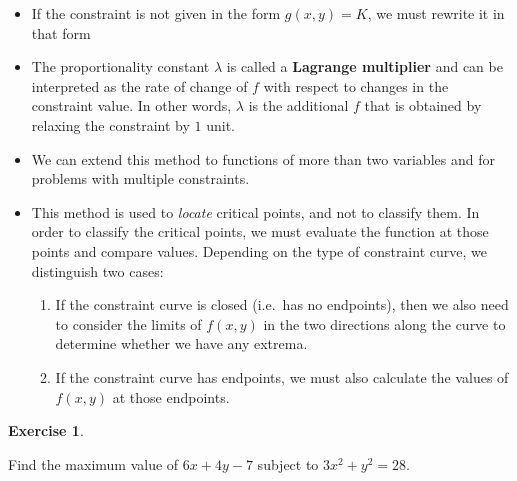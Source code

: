 \documentclass[
]{book}
\providecommand{\tightlist}{%
  \setlength{\itemsep}{0pt}\setlength{\parskip}{0pt}}
\theoremstyle{definition}
\theoremstyle{definition}
\theoremstyle{definition}
\newtheorem{exercise}{Exercise}[chapter]
\theoremstyle{definition}
\theoremstyle{remark}
\begin{document}
\begin{itemize}
\tightlist
\item
  If the constraint is not given in the form \(g(x,y)=K\), we must rewrite it in that form
\item
  The proportionality constant \(\lambda\) is called a \textbf{Lagrange multiplier} and can be interpreted as the rate of change of \(f\) with respect to changes in the constraint value. In other words, \(\lambda\) is the additional \(f\) that is obtained by relaxing the constraint
  by \(1\) unit.
\item
  We can extend this method to functions of more than two variables and for problems with multiple constraints.
\item
  This method is used to \emph{locate} critical points, and not to classify them. In order to classify the critical points, we must evaluate the function at those points and compare values. Depending on the type of constraint curve, we distinguish two cases:

  \begin{enumerate}
  \def\labelenumi{\arabic{enumi}.}
  \tightlist
  \item
    If the constraint curve is closed (i.e.~has no endpoints), then we also need to consider the limits of \(f(x,y)\) in the two directions along the curve to determine whether we have any extrema.
  \item
    If the constraint curve has endpoints, we must also calculate the values of \(f(x,y)\) at those endpoints.
  \end{enumerate}
\end{itemize}

\begin{exercise}
\protect\hypertarget{exr:unlabeled-div-68}{}\label{exr:unlabeled-div-68}

Find the maximum value of \(6x+4y-7\) subject to \(3x^2+y^2=28\).

\end{exercise}
\end{document}
